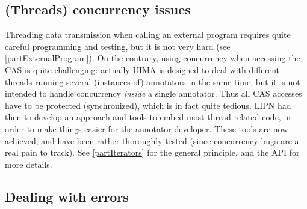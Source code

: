 \documentclass{article}
\begin{document}
\subsection{(Threads) concurrency issues}
\label{partThreadsConcurrency}





Threading data transmission when calling an external program requires quite careful programming and testing, but it is not very hard (see \ref{partExternalProgram}). On the contrary, using concurrency when accessing the CAS is quite challenging: actually UIMA is designed  to deal with different threads running several (instances of) annotators in the same time, but it is not intended to handle concurrency {\em inside} a single annotator. Thus all CAS accesses have to be protected (synchronized), which is in fact quite tedious. LIPN had then to develop an approach and tools to embed most thread-related code, in order to make things easier for the annotator developer. These tools are now achieved, and have been rather thoroughly tested (since concurrency bugs are a real pain to track). See \ref{partIterators} for the general principle, and the API for more details.



\subsection{Dealing with errors}
\label{partStopAsSoonAsPossible}
\end{document}
